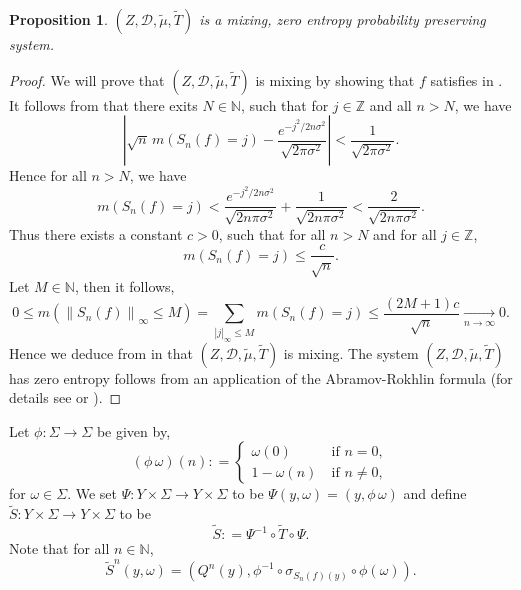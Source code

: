 \documentclass[12pt,reqno]{amsart}
\newcommand{\N}{\mathbb{N}}
\newcommand{\Z}{\mathbb{Z}}
\newcommand{\TT}{\widetilde{T}}
\newcommand{\TS}{\widetilde{S}}
\newcommand{\Tmu}{\widetilde{\mu}}
\newtheorem{prop}[thm]{Proposition}
\theoremstyle{definition}
\begin{document}
\begin{prop}\label{prop:TT_WM_0} $(Z,\mathcal{D},\Tmu,\TT)$ is a mixing, zero entropy probability preserving system.
\end{prop}
\begin{proof} We will prove that $(Z,\mathcal{D},\Tmu,\TT)$ is mixing by showing that $f$ satisfies  in . It follows from   that there exits $N \in \N$, such that for $j \in \Z$ and all $n > N$, we have
\[
\left|\sqrt{n}\, m\left(S_n(f)=j\right) -\frac{e^{-j^2/2n\sigma^2}}{\sqrt{2\pi \sigma^2}}\right| < \frac{1}{\sqrt{2\pi \sigma^2}}.
\]
Hence for all $n> N$, we have 
\[
m\left(S_n(f)=j\right) < \frac{e^{-j^2/2n\sigma^2}}{\sqrt{2 n \pi \sigma^2}} + \frac{1}{\sqrt{2 n\pi \sigma^2}} < \frac{2}{\sqrt{2 n\pi \sigma^2}}.
\]
Thus there exists a constant $c>0$, such that for all $n > N$ and for all $j\in\Z$,
\begin{equation}\label{eq:LCLT_bound}
m\left(S_n(f)=j\right)\leq \frac{c}{\sqrt{n}}.
\end{equation} 
Let $M\in\mathbb{N}$, then it follows,
\[
0\leq m\left(\left\|S_n(f)\right\|_\infty\leq M\right)=\sum_{|j|_\infty\leq M} m\left(S_n(f)=j\right)\leq \frac{(2M+1) c}{\sqrt{n}}\xrightarrow[n\to\infty]{}0.
\]
Hence we deduce from  in  that $(Z,\mathcal{D},\Tmu,\TT)$ is  mixing.  
The system $(Z,\mathcal{D},\Tmu,\TT)$ has zero entropy follows from an application of the Abramov-Rokhlin formula (for details see \cite[Proposition 2.2]{Huang_Shao_Ye_2024_A} or \cite[
Proposition 4.3]{kosloff_Sanadhya_2024}). 
\end{proof}
Let $\phi: \Sigma \rightarrow \Sigma$ be given by, 
\begin{equation*}
    (\phi \,\omega)(n) : =\begin{cases}
\omega(0) &\ \text{if}\,\, n =0,\\
1-\omega(n) &\ \text{if}\,\, n \neq 0,
\end{cases}
\end{equation*}for $\omega \in \Sigma$. We set $\Psi : Y \times \Sigma \rightarrow Y \times \Sigma$ to be $\Psi (y,\omega) = (y, \phi\,\omega)$ and define $\TS : Y \times \Sigma \rightarrow Y \times \Sigma$ to be
\begin{equation}\label{eq:TS}
    \TS  : = \Psi^{-1} \circ \TT \circ \Psi.
\end{equation}
Note that for all $n\in\N$,
\begin{equation}\label{eq:TS^n_1}
    \TS^n (y, \omega) = (Q^n(y), \phi^{-1}\circ\sigma_{S_n(f)(y)} \circ \phi(\omega)).
\end{equation}
\end{document}

